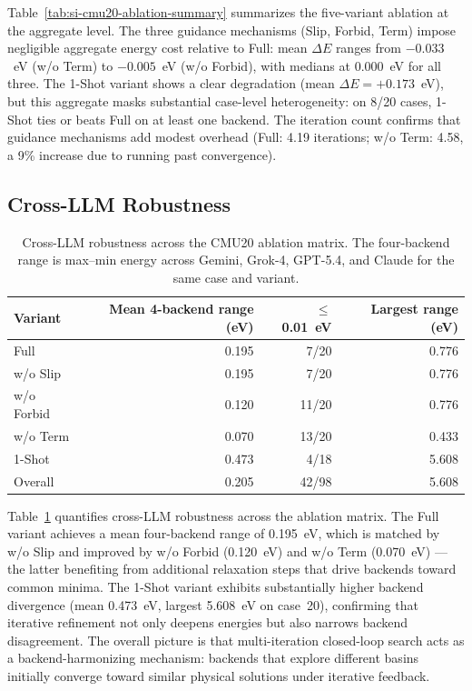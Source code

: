 \documentclass[%
 preprint,
 superscriptaddress,
 amsmath,amssymb,
 aps,
 prb,
 floatfix,
]{revtex4-2}
\begin{document}
Table~\ref{tab:si-cmu20-ablation-summary} summarizes the five-variant ablation at the aggregate level. The three guidance mechanisms (Slip, Forbid, Term) impose negligible aggregate energy cost relative to Full: mean $\Delta E$ ranges from $-0.033$~eV (w/o Term) to $-0.005$~eV (w/o Forbid), with medians at 0.000~eV for all three. The 1-Shot variant shows a clear degradation (mean $\Delta E = +0.173$~eV), but this aggregate masks substantial case-level heterogeneity: on 8/20 cases, 1-Shot ties or beats Full on at least one backend. The iteration count confirms that guidance mechanisms add modest overhead (Full: 4.19 iterations; w/o Term: 4.58, a 9\% increase due to running past convergence).

\subsection{Cross-LLM Robustness}

\begin{table}[ht]
\centering
\scriptsize
\caption{Cross-LLM robustness across the CMU20 ablation matrix. The four-backend range is max--min energy across Gemini, Grok-4, GPT-5.4, and Claude for the same case and variant.}
\label{tab:si-cmu20-cross-llm}
\begin{tabular}{lrrr}
\toprule
Variant & Mean 4-backend range (eV) & $\leq$0.01~eV & Largest range (eV) \\
\midrule
Full      & 0.195 &  7/20 & 0.776 \\
w/o Slip  & 0.195 &  7/20 & 0.776 \\
w/o Forbid & 0.120 & 11/20 & 0.776 \\
w/o Term   & 0.070 & 13/20 & 0.433 \\
1-Shot    & 0.473 &  4/18 & 5.608 \\
\midrule
Overall   & 0.205 & 42/98 & 5.608 \\
\bottomrule
\end{tabular}
\end{table}

Table~\ref{tab:si-cmu20-cross-llm} quantifies cross-LLM robustness across the ablation matrix. The Full variant achieves a mean four-backend range of 0.195~eV, which is matched by w/o Slip and improved by w/o Forbid (0.120~eV) and w/o Term (0.070~eV) — the latter benefiting from additional relaxation steps that drive backends toward common minima. The 1-Shot variant exhibits substantially higher backend divergence (mean 0.473~eV, largest 5.608~eV on case~20), confirming that iterative refinement not only deepens energies but also narrows backend disagreement. The overall picture is that multi-iteration closed-loop search acts as a backend-harmonizing mechanism: backends that explore different basins initially converge toward similar physical solutions under iterative feedback.
\end{document}
